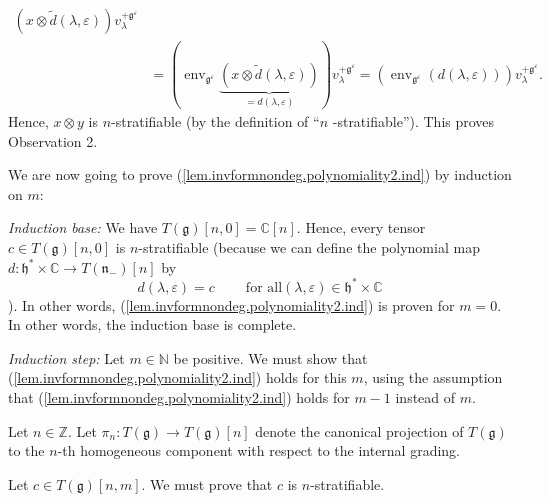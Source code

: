 \documentclass[etingof-lie.tex]{subfiles}
\begin{document}
{\begin{align*}
{{{}}\left(  x\otimes\widetilde{d}\left(  \lambda,\varepsilon\right)  \right)
}v_{\lambda}^{+\mathfrak{g}^{\varepsilon}}\\
&  =\left(  \operatorname*{env}\nolimits_{\mathfrak{g}^{\varepsilon}%
}\underbrace{\left(  x\otimes\widetilde{d}\left(  \lambda,\varepsilon\right)
\right)  }_{=d\left(  \lambda,\varepsilon\right)  }\right)  v_{\lambda
}^{+\mathfrak{g}^{\varepsilon}}=\left(  \operatorname*{env}%
\nolimits_{\mathfrak{g}^{\varepsilon}}\left(  d\left(  \lambda,\varepsilon
\right)  \right)  \right)  v_{\lambda}^{+\mathfrak{g}^{\varepsilon}}.
\end{align*}
Hence, $x\otimes y$ is $n$-stratifiable (by the definition of ``$n$%
-stratifiable''). This proves Observation 2.}

We are now going to prove (\ref{lem.invformnondeg.polynomiality2.ind}) by
induction on $m$:

\textit{Induction base:} We have $T\left(  \mathfrak{g}\right)  \left[
n,0\right]  =\mathbb{C}\left[  n\right]  $. Hence, every tensor $c\in T\left(
\mathfrak{g}\right)  \left[  n,0\right]  $ is $n$-stratifiable (because we can
define the polynomial map $d:\mathfrak{h}^{\ast}\times\mathbb{C}\rightarrow
T\left(  \mathfrak{n}_{-}\right)  \left[  n\right]  $ by%
\[
d\left(  \lambda,\varepsilon\right)  =c\ \ \ \ \ \ \ \ \ \ \text{for all
}\left(  \lambda,\varepsilon\right)  \in\mathfrak{h}^{\ast}\times\mathbb{C}%
\]
). In other words, (\ref{lem.invformnondeg.polynomiality2.ind}) is proven for
$m=0$. In other words, the induction base is complete.

\textit{Induction step:} Let $m\in\mathbb{N}$ be positive. We must show that
(\ref{lem.invformnondeg.polynomiality2.ind}) holds for this $m$, using the
assumption that (\ref{lem.invformnondeg.polynomiality2.ind}) holds for $m-1$
instead of $m$.

Let $n\in\mathbb{Z}$. Let $\pi_{n}:T\left(  \mathfrak{g}\right)  \rightarrow
T\left(  \mathfrak{g}\right)  \left[  n\right]  $ denote the canonical
projection of $T\left(  \mathfrak{g}\right)  $ to the $n$-th homogeneous
component with respect to the internal grading.

Let $c\in T\left(  \mathfrak{g}\right)  \left[  n,m\right]  $. We must prove
that $c$ is $n$-stratifiable.
\end{document}

